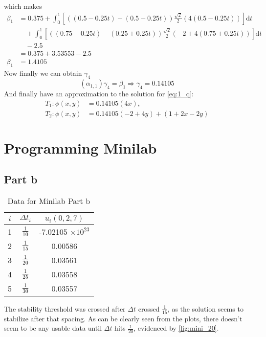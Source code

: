 \documentclass[12pt]{article}
\newcommand{\dd}[1]{\mathrm{d}{#1}}
\begin{document}
which makes 
\begin{equation}
  \label{eq:1_beta_para}
  \begin{aligned}
    \beta_1&= 0.375 +
    \int_0^1\left[((0.5-0.25t)-(0.5-0.25t))\frac{\sqrt{2}}{2}(4(0.5-0.25t))\right]\dd{t} 
    \\ &\quad+
    \int_0^1\left[((0.75-0.25t)-(0.25+0.25t))\frac{\sqrt{2}}{2}(-2+4(0.75+0.25t))\right]\dd{t}
    \\ &\quad- 2.5\\
    &= 0.375 + 3.53553 - 2.5 \\
    \beta_1 &= 1.4105
  \end{aligned}
\end{equation}
Now finally we can obtain $\gamma_4$ 
\begin{equation}
  \label{eq:1_gamma_4}
  (\alpha_{1,1})\gamma_4 = \beta_1 \Rightarrow \gamma_4 = 0.14105
\end{equation}
And finally have an approximation to the solution for \cref{eq:1_q}:
\begin{equation}
  \label{eq:1_approx_t_phi}
  \boxed{
    \begin{aligned}
      T_1:\phi(x,y)&=0.14105(4x), \\
      T_2:\phi(x,y)&=0.14105(-2+4y)+(1+2x-2y)
    \end{aligned}
  }
\end{equation}

\section{Programming Minilab}
\subsection{Part b}
\begin{table}[H]
  \centering
  \begin{tabular}[H]{ccc}
    \hline
    $i$ & $\Delta t_i$ & $u_i(0,2,7)$ \\
    \hline
    1 & $\frac{1}{10}$ & -7.02105 $\times 10^{23}$ \\
    2 & $\frac{1}{15}$ & 0.00586 \\
    3 & $\frac{1}{20}$ & 0.03561 \\
    4 & $\frac{1}{25}$ & 0.03558 \\
    5 & $\frac{1}{30}$ & 0.03557 \\
    \hline
  \end{tabular}
  \caption{Data for Minilab Part b}
  \label{tab:mini_b}
\end{table}
The stability threshold was crossed after $\Delta t$ crossed
$\frac{1}{15}$, as the solution seems to stabilize after that
spacing. As can be clearly seen from the plots, there doesn't seem to
be any usable data until $\Delta t$ hits $\frac{1}{20}$, evidenced by
\cref{fig:mini_20}. 
\end{document}

